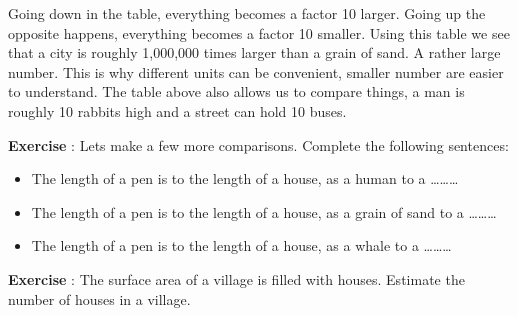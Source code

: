 Going down in the table, everything becomes a factor 10 larger. Going up the opposite happens, everything becomes a factor 10 smaller. Using this table we see that a city is roughly 1,000,000 times larger than a grain of sand. A rather large number. This is why different units can be convenient, smaller number are easier to understand. The table above also allows us to compare things, a man is roughly 10 rabbits high and a street can hold 10 buses.

\begin{shaded}
\textbf{Exercise \theExercise {}} : Lets make a few more comparisons. Complete the following sentences:
\begin{itemize}
\item The length of a pen is to the length of a house, as a human to a \ldots \ldots \ldots
\item The length of a pen is to the length of a house, as a grain of sand to a \ldots \ldots \ldots
\item The length of a pen is to the length of a house, as a whale to a \ldots \ldots \ldots
\end{itemize}\end{shaded}
\begin{shaded}
\textbf{Exercise \theExercise {}} : The surface area of a village is filled with houses. Estimate the number of houses in a village.\end{shaded}

